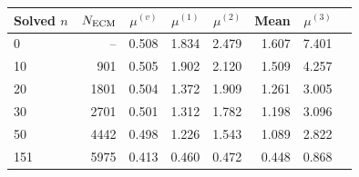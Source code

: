 \begin{tabular}{lrrrrrrr}
\toprule
Solved $n$ & $N_{\rm ECM}$ & $\mu^{(v)}$ & $\mu^{(1)}$ & $\mu^{(2)}$ & Mean & $\mu^{(3)}$ \\
\midrule
0 & -- & 0.508 & 1.834 & 2.479 & 1.607 & 7.401 \\
10 & 901 & 0.505 & 1.902 & 2.120 & 1.509 & 4.257 \\
20 & 1801 & 0.504 & 1.372 & 1.909 & 1.261 & 3.005 \\
30 & 2701 & 0.501 & 1.312 & 1.782 & 1.198 & 3.096 \\
50 & 4442 & 0.498 & 1.226 & 1.543 & 1.089 & 2.822 \\
151 & 5975 & 0.413 & 0.460 & 0.472 & 0.448 & 0.868 \\
\bottomrule
\end{tabular}
